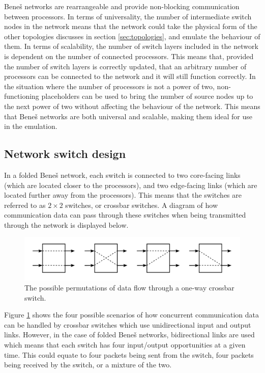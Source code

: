 \documentclass[a4paper, 12pt]{article}
\begin{document}
Bene\v{s} networks are rearrangeable and provide non-blocking communication between processors. In terms of universality, the number of intermediate switch nodes in the network means that the network could take the physical form of the other topologies discusses in section \ref{sec:topologies}, and emulate the behaviour of them. In terms of scalability, the number of switch layers included in the network is dependent on the number of connected processors. This means that, provided the number of switch layers is correctly updated, that an arbitrary number of processors can be connected to the network and it will still function correctly. In the situation where the number of processors is not a power of two, non-functioning placeholders can be used to bring the number of source nodes up to the next power of two without affecting the behaviour of the network. This means that Bene\v{s} networks are both universal and scalable, making them ideal for use in the emulation.

\subsection{Network switch design}
\label{sec:switch_design}

In a folded Bene\v{s} network, each switch is connected to two core-facing links (which are located closer to the processors), and two edge-facing links (which are located further away from the processors). This means that the switches are referred to as $2 \times 2$ switches, or crossbar switches. A diagram of how communication data can pass through these switches when being transmitted through the network is displayed below.

\begin{figure}[H]
\centering
\includegraphics[width=\textwidth]{switch_directions.png}
\caption[The possible permutations of data flow through a one-way crossbar switch]{The possible permutations of data flow through a one-way crossbar switch.}
\label{fig:switch_direcitons}
\end{figure}

Figure \ref{fig:switch_direcitons} shows the four possible scenarios of how concurrent communication data can be handled by crossbar switches which use unidirectional input and output links. However, in the case of folded Bene\v{s} networks, bidirectional links are used which means that each switch has four input/output opportunities at a given time. This could equate to four packets being sent from the switch, four packets being received by the switch, or a mixture of the two.
\end{document}
